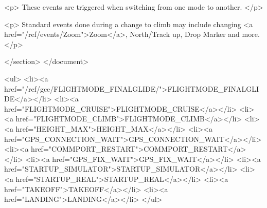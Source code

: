<p>
These events are triggered when switching from one mode to another.
</p>

<p>
Standard events done during a change to climb may include changing <a
href="/ref/events/Zoom">Zoom</a>, North/Track up, Drop Marker and more.
</p>


</section>
</document>



				<ul>
					<li><a href="/ref/gce/FLIGHTMODE_FINALGLIDE/">FLIGHTMODE_FINALGLIDE</a></li>
					<li><a href="FLIGHTMODE_CRUISE">FLIGHTMODE_CRUISE</a></li>
					<li><a href="FLIGHTMODE_CLIMB">FLIGHTMODE_CLIMB</a></li>
					<li><a href="HEIGHT_MAX">HEIGHT_MAX</a></li>
					<li><a href="GPS_CONNECTION_WAIT">GPS_CONNECTION_WAIT</a></li>
					<li><a href="COMMPORT_RESTART">COMMPORT_RESTART</a></li>
					<li><a href="GPS_FIX_WAIT">GPS_FIX_WAIT</a></li>
					<li><a href="STARTUP_SIMULATOR">STARTUP_SIMULATOR</a></li>
					<li><a href="STARTUP_REAL">STARTUP_REAL</a></li>
					<li><a href="TAKEOFF">TAKEOFF</a></li>
					<li><a href="LANDING">LANDING</a></li>
				</ul>
